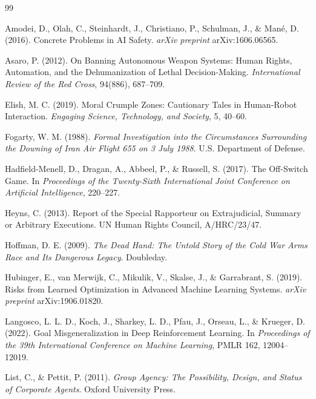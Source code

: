 \documentclass[11pt]{article}
\begin{document}
\begin{thebibliography}{99}
\setlength{\itemsep}{0.25em}

Amodei, D., Olah, C., Steinhardt, J., Christiano, P., Schulman, J., \& Man\'{e}, D. (2016). Concrete Problems in AI Safety. \textit{arXiv preprint} arXiv:1606.06565.

Asaro, P. (2012). On Banning Autonomous Weapon Systems: Human Rights, Automation, and the Dehumanization of Lethal Decision-Making. \textit{International Review of the Red Cross}, 94(886), 687--709.

Elish, M. C. (2019). Moral Crumple Zones: Cautionary Tales in Human-Robot Interaction. \textit{Engaging Science, Technology, and Society}, 5, 40--60.

Fogarty, W. M. (1988). \textit{Formal Investigation into the Circumstances Surrounding the Downing of Iran Air Flight 655 on 3 July 1988}. U.S. Department of Defense.

Hadfield-Menell, D., Dragan, A., Abbeel, P., \& Russell, S. (2017). The Off-Switch Game. In \textit{Proceedings of the Twenty-Sixth International Joint Conference on Artificial Intelligence}, 220--227.

Heyns, C. (2013). Report of the Special Rapporteur on Extrajudicial, Summary or Arbitrary Executions. UN Human Rights Council, A/HRC/23/47.

Hoffman, D. E. (2009). \textit{The Dead Hand: The Untold Story of the Cold War Arms Race and Its Dangerous Legacy}. Doubleday.

Hubinger, E., van Merwijk, C., Mikulik, V., Skalse, J., \& Garrabrant, S. (2019). Risks from Learned Optimization in Advanced Machine Learning Systems. \textit{arXiv preprint} arXiv:1906.01820.

Langosco, L. L. D., Koch, J., Sharkey, L. D., Pfau, J., Orseau, L., \& Krueger, D. (2022). Goal Misgeneralization in Deep Reinforcement Learning. In \textit{Proceedings of the 39th International Conference on Machine Learning}, PMLR 162, 12004--12019.

List, C., \& Pettit, P. (2011). \textit{Group Agency: The Possibility, Design, and Status of Corporate Agents}. Oxford University Press.


\end{thebibliography}
\end{document}
